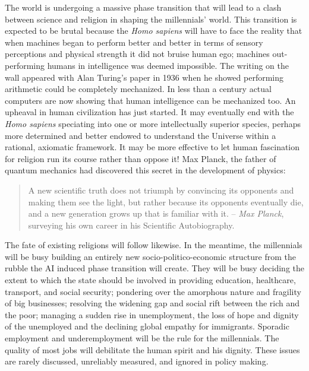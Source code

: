 \begin{multicols}{2}
The world is undergoing a massive phase transition that will lead to a clash between science and religion in shaping the millennials’ world. This transition is expected to be brutal because the \textit{Homo sapiens} will have to face the reality that when machines began to perform better and better in terms of sensory perceptions and physical strength it did not bruise human ego; machines out-performing humans in intelligence was deemed impossible. The writing on the wall appeared with Alan Turing's paper in 1936 when he showed performing arithmetic could be completely mechanized. In less than a century actual computers are now showing that human intelligence can be mechanized too. An upheaval in human civilization has just started. It may eventually end with the \textit{Homo sapiens} speciating into one or more intellectually superior species, perhaps more determined and better endowed to understand the Universe within a rational, axiomatic framework. It may be more effective to let human fascination for religion run its course rather than oppose it! Max Planck, the father of quantum mechanics had discovered this secret in the development of physics:
\begin{quote}
A new scientific truth does not triumph by convincing its opponents and making them see the light, but rather because its opponents eventually die, and a new generation grows up that is familiar with it. -- \textit{Max Planck}, surveying his own career in his Scientific Autobiography. 
\end{quote}

The fate of existing religions will follow likewise. In the meantime, the millennials will be busy building an entirely new socio-politico-economic structure from the rubble the AI induced phase transition will create. They will be busy deciding the extent to which the state should be involved in providing education, healthcare, transport, and social security; pondering over the amorphous nature and fragility of big businesses; resolving the widening gap and social rift between the rich and the poor; managing a sudden rise in unemployment, the loss of hope and dignity of the unemployed and the declining global empathy for immigrants. Sporadic employment and underemployment will be the rule for the millennials. The quality of most jobs will debilitate the human spirit and his dignity. These issues are rarely discussed, unreliably measured, and ignored in policy making.


\end{multicols}
